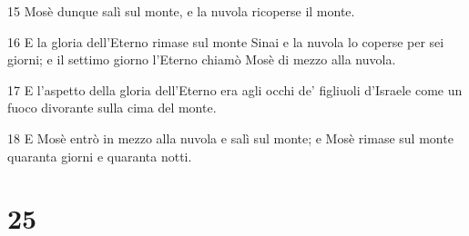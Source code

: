 \par 15 Mosè dunque salì sul monte, e la nuvola ricoperse il monte.
\par 16 E la gloria dell'Eterno rimase sul monte Sinai e la nuvola lo coperse per sei giorni; e il settimo giorno l'Eterno chiamò Mosè di mezzo alla nuvola.
\par 17 E l'aspetto della gloria dell'Eterno era agli occhi de' figliuoli d'Israele come un fuoco divorante sulla cima del monte.
\par 18 E Mosè entrò in mezzo alla nuvola e salì sul monte; e Mosè rimase sul monte quaranta giorni e quaranta notti.

\chapter{25}


